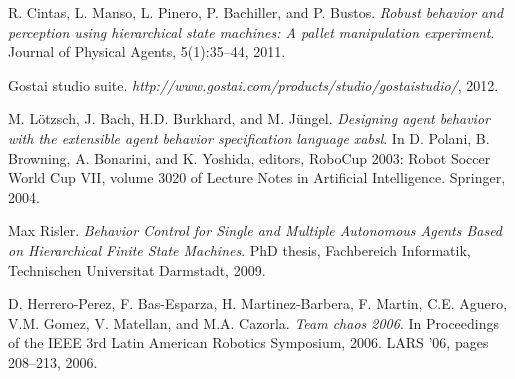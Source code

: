 \documentclass[journal,twoside]{JoPhA}
\begin{document}
\begin{thebibliography}{1}
R. Cintas, L. Manso, L. Pinero, P. Bachiller, and P. Bustos. \emph{Robust behavior and perception using hierarchical state machines: A pallet manipulation experiment}. Journal of Physical Agents, 5(1):35–44, 2011.

Gostai studio suite. \emph{http://www.gostai.com/products/studio/gostaistudio/}, 2012.

M. L\"otzsch, J. Bach, H.D. Burkhard, and M. J\"ungel. \emph{Designing agent behavior with the extensible agent behavior specification language xabsl}. In D. Polani, B. Browning, A. Bonarini, and K. Yoshida, editors, RoboCup 2003: Robot Soccer World Cup VII, volume 3020 of Lecture Notes in Artificial Intelligence. Springer, 2004.

Max Risler. \emph{Behavior Control for Single and Multiple Autonomous Agents Based on Hierarchical Finite State Machines}. PhD thesis, Fachbereich Informatik, Technischen Universitat Darmstadt, 2009.

D. Herrero-Perez, F. Bas-Esparza, H. Martinez-Barbera, F. Martin, C.E. Aguero, V.M. Gomez, V. Matellan, and M.A. Cazorla. \emph{Team chaos 2006}. In Proceedings of the IEEE 3rd Latin American Robotics Symposium, 2006. LARS ’06, pages 208–213, 2006.

\end{thebibliography}
\end{document}
